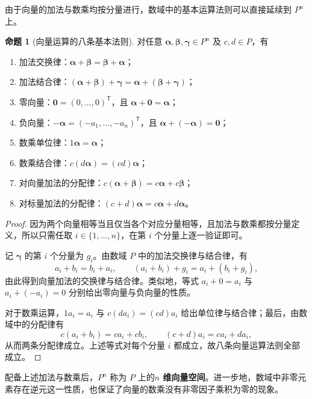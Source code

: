 \documentclass[UTF8, fontset=fandol, a4paper, 12pt]{ctexart}
\theoremstyle{definition}
\newtheorem{proposition}[definition]{命题}
\begin{document}
由于向量的加法与数乘均按分量进行，数域中的基本运算法则可以直接延续到 $P^n$ 上。

\begin{proposition}[向量运算的八条基本法则]
对任意 $\boldsymbol\alpha,\boldsymbol\beta,\boldsymbol\gamma\in P^n$ 及 $c,d\in P$，有
\begin{enumerate}
  \item 加法交换律：$\boldsymbol\alpha+\boldsymbol\beta=\boldsymbol\beta+\boldsymbol\alpha$；
  \item 加法结合律：$(\boldsymbol\alpha+\boldsymbol\beta)+\boldsymbol\gamma=\boldsymbol\alpha+(\boldsymbol\beta+\boldsymbol\gamma)$；
  \item 零向量：$\boldsymbol0=(0,\ldots,0)^{\mathsf T}$，且 $\boldsymbol\alpha+\boldsymbol0=\boldsymbol\alpha$；
  \item 负向量：$-\boldsymbol\alpha=(-a_1,\ldots,-a_n)^{\mathsf T}$，且 $\boldsymbol\alpha+(-\boldsymbol\alpha)=\boldsymbol0$；
  \item 数乘单位律：$1\boldsymbol\alpha=\boldsymbol\alpha$；
  \item 数乘结合律：$c(d\boldsymbol\alpha)=(cd)\boldsymbol\alpha$；
  \item 对向量加法的分配律：$c(\boldsymbol\alpha+\boldsymbol\beta)=c\boldsymbol\alpha+c\boldsymbol\beta$；
  \item 对标量加法的分配律：$(c+d)\boldsymbol\alpha=c\boldsymbol\alpha+d\boldsymbol\alpha$。
\end{enumerate}
\end{proposition}
\begin{proof}
因为两个向量相等当且仅当各个对应分量相等，且加法与数乘都按分量定义，所以只需任取 $i\in\{1,\ldots,n\}$，在第 $i$ 个分量上逐一验证即可。

记 $\boldsymbol\gamma$ 的第 $i$ 个分量为 $g_i$。由数域 $P$ 中的加法交换律与结合律，有
\[
  a_i+b_i=b_i+a_i,\qquad
  (a_i+b_i)+g_i=a_i+(b_i+g_i),
\]
由此得到向量加法的交换律与结合律。类似地，等式 $a_i+0=a_i$ 与 $a_i+(-a_i)=0$ 分别给出零向量与负向量的性质。

对于数乘运算，$1a_i=a_i$ 与 $c(da_i)=(cd)a_i$ 给出单位律与结合律；最后，由数域中的分配律有
\[
  c(a_i+b_i)=ca_i+cb_i,\qquad (c+d)a_i=ca_i+da_i,
\]
从而两条分配律成立。上述等式对每个分量 $i$ 都成立，故八条向量运算法则全部成立。
\end{proof}

配备上述加法与数乘后，$P^n$ 称为 $P$ 上的\textbf{$n$ 维向量空间}。进一步地，数域中非零元素存在逆元这一性质，也保证了向量的数乘没有非零因子乘积为零的现象。
\end{document}

